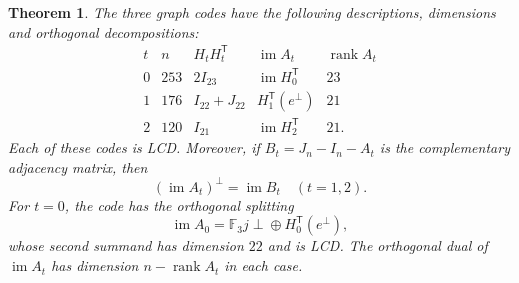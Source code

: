 \documentclass[11pt,a4paper]{article}
\newtheorem{theorem}{Theorem}[section]
\numberwithin{equation}{section}
\newcommand{\im}{\operatorname{im}}
\newcommand{\rank}{\operatorname{rank}}
\begin{document}
\begin{theorem}\label{ULCD.ResidualSteiner}
The three graph codes have the following descriptions, dimensions and
orthogonal decompositions:
\[
\begin{array}{c|c|c|c|c}
t&n& H_tH_t^{\mathsf T}&\im A_t&\rank A_t\\\hline
0&253&2I_{23}&\im H_0^{\mathsf T}&23\\
1&176&I_{22}+J_{22}&H_1^{\mathsf T}(e^\perp)&21\\
2&120&I_{21}&\im H_2^{\mathsf T}&21.
\end{array}
\]
Each of these codes is LCD. Moreover, if $B_t=J_n-I_n-A_t$ is the
complementary adjacency matrix, then
\[
 (\im A_t)^\perp=\im B_t\quad(t=1,2).
\]
For $t=0$, the code has the orthogonal splitting
\[
 \im A_0=\mathbb F_3j\perp\!\oplus H_0^{\mathsf T}(e^\perp),
\]
whose second summand has dimension $22$ and is LCD. The orthogonal dual
of $\im A_t$ has dimension $n-\rank A_t$ in each case.
\end{theorem}
\end{document}
